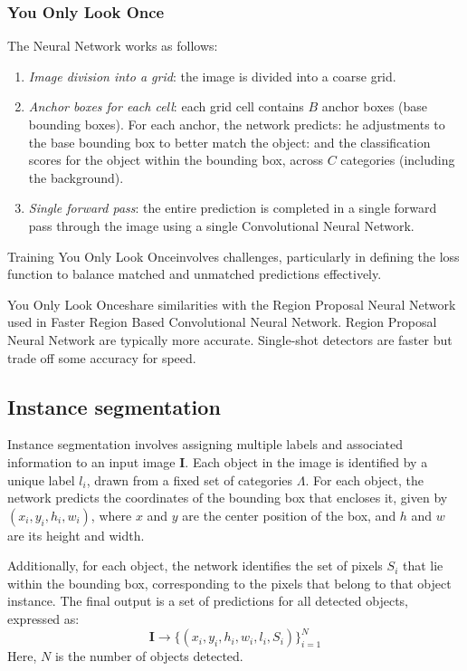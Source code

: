 \subsubsection{You Only Look Once}
The Neural Network works as follows: 
\begin{enumerate}
    \item \textit{Image division into a grid}: the image is divided into a coarse grid. 
    \item \textit{Anchor boxes for each cell}: each grid cell contains $B$ anchor boxes (base bounding boxes). 
        For each anchor, the network predicts: he adjustments to the base bounding box to better match the object: and the classification scores for the object within the bounding box, across $C$ categories (including the background).
    \item \textit{Single forward pass}: the entire prediction is completed in a single forward pass through the image using a single Convolutional Neural Network.
\end{enumerate}
Training You Only Look Onceinvolves challenges, particularly in defining the loss function to balance matched and unmatched predictions effectively.

You Only Look Onceshare similarities with the Region Proposal Neural Network used in Faster Region Based Convolutional Neural Network.
Region Proposal Neural Network are typically more accurate.
Single-shot detectors are faster but trade off some accuracy for speed.

\subsection{Instance segmentation}
Instance segmentation involves assigning multiple labels and associated information to an input image $\mathbf{I}$. 
Each object in the image is identified by a unique label $l_i$, drawn from a fixed set of categories $\Lambda$. 
For each object, the network predicts the coordinates of the bounding box that encloses it, given by $(x_i, y_i, h_i, w_i)$, where $x$ and $y$ are the center position of the box, and $h$ and $w$ are its height and width.

Additionally, for each object, the network identifies the set of pixels $S_i$ that lie within the bounding box, corresponding to the pixels that belong to that object instance. 
The final output is a set of predictions for all detected objects, expressed as:
\[\mathbf{I} \rightarrow \{(x_i, y_i, h_i, w_i, l_i, S_i)\}_{i=1}^N\]
Here, $N$ is the number of objects detected.

